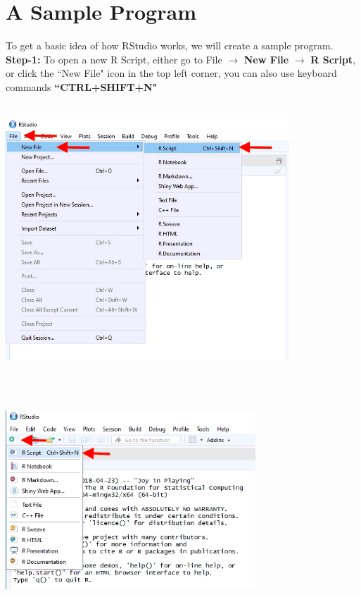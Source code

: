 \documentclass[a4paper]{report}
\begin{document}
        
\newpage \section{A Sample Program}
        \begin{flushleft}
        To get a basic idea of how RStudio works, we will create a sample program. 
        \newline\newline
        \textbf{Step-1:} To open a new R Script, either go to File $\longrightarrow$ \textbf{New File} $\longrightarrow$ \textbf{R Script}, or click the ``New File" icon in the top left corner, you can also use keyboard commands \textbf{``CTRL+SHIFT+N"} 
       
        \includegraphics[width=4.2in, height = 4in]{images/SP1.png}
        \includegraphics[width=3.7in, height = 3.6in]{images/SP2.png}
        

\end{flushleft}
\end{document}
